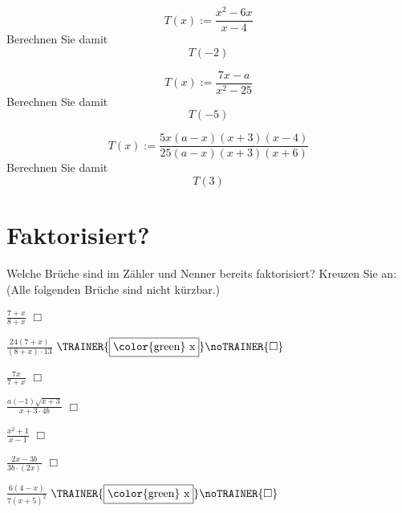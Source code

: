{\nextBbwAufgabenNummer{}
\begin{bbwAufgabenBlock}
\item $$T(x) := \frac{x^2-6x}{x-4}$$
Berechnen Sie damit
$$T(-2)$$

\item $$T(x):=\frac{7x-a}{x^2-25}$$
Berechnen Sie damit
$$T(-5)$$

\item $$T(x):= \frac{5x(a-x)(x+3)(x-4)}{25(a-x)(x+3)(x+6)}$$
Berechnen Sie damit
$$T(3)$$
\end{bbwAufgabenBlock}

\newpage
\section{Faktorisiert?}

Welche Brüche sind im Zähler und Nenner bereits faktorisiert? Kreuzen Sie an:
(Alle folgenden Brüche sind nicht kürzbar.)

\newcommand{\BoxTT}{\TRAINER{\fbox{\color{green} x}}\noTRAINER{\Box}}

\begin{bbwAufgabenBlock}
\item $\frac{7+x}{8+x}$ $\Box{}$ 

\item $\frac{24(7+x)}{(8+x)\cdot{}13}$ $\BoxTT$ 

\item $\frac{7x}{7+x}$ $\Box{}$ 

\item $\frac{a(-1)\sqrt{x+3}}{x+3\cdot{}4b}$ $\Box{}$ 

\item $\frac{x^2+1}{x-1}$ $\Box{}$ 

\item $\frac{2x-3b}{3b\cdot{}(2x)}$ $\Box{}$ 

\item $\frac{6(4-x)}{7(x+5)^2}$ $\BoxTT$ 


\end{bbwAufgabenBlock}}
